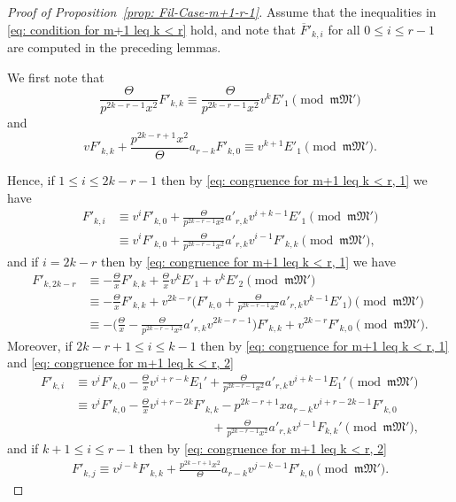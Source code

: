 \documentclass[11pt]{amsart}
\theoremstyle{definition}
\numberwithin{equation}{subsection}
\theoremstyle{plain}
\theoremstyle{plain}
\theoremstyle{plain}
\theoremstyle{plain}
\theoremstyle{plain}
\theoremstyle{plain}
\theoremstyle{plain}
\theoremstyle{plain}
\theoremstyle{plain}
\theoremstyle{plain}
\theoremstyle{plain}
\theoremstyle{plain}
\theoremstyle{definition}
\theoremstyle{definition}
\theoremstyle{definition}
\theoremstyle{remark}
\renewcommand{\(}{\textup{(}}
\renewcommand{\)}{\textup{)}}
\newcommand{\fM}{\mathfrak{M}}
\newcommand{\fm}{\mathfrak{m}}
\newcommand{\barF}{\overline{F}}
\begin{document}
\begin{proof}[Proof of Proposition~\ref{prop: Fil-Case-m+1-r-1}]
Assume that the inequalities in \eqref{eq: condition for m+1 leq k < r} hold, and note that $\barF'_{k,i}$ for all $0\leq i\leq r-1$ are computed in the preceding lemmas.

We first note that
\begin{equation}\label{eq: congruence for m+1 leq k < r, 1}
    \frac{\Theta}{p^{2k-r-1}x^2}F'_{k,k}
    \equiv
    \frac{\Theta}{p^{2k-r-1}x^2}v^kE'_1
    \pmod{\fm\fM'}
\end{equation}
and
\begin{equation}\label{eq: congruence for m+1 leq k < r, 2}
    vF'_{k,k}+\frac{p^{2k-r+1}x^2}{\Theta}a_{r-k}F'_{k,0}
    \equiv v^{k+1}E'_1  \pmod{\fm\fM'}.
\end{equation}


Hence, if $1\leq i\leq 2k-r-1$ then by \eqref{eq: congruence for m+1 leq k < r, 1} we have
\begin{align*}
F'_{k,i}
    &\equiv
    v^iF'_{k,0}+\frac{\Theta}{p^{2k-r-1}x^2}a'_{r,k}v^{i+k-1}E'_1\pmod{\fm\fM'}\\
    &\equiv
    v^iF'_{k,0}+\frac{\Theta}{p^{2k-r-1}x^2}a'_{r,k}v^{i-1}F'_{k,k}
    \pmod{\fm\fM'},
\end{align*}
and if $i=2k-r$ then by \eqref{eq: congruence for m+1 leq k < r, 1} we have
\begin{align*}
F'_{k,2k-r}
    &\equiv
    -\frac{\Theta}{x}F'_{k,k}
    +\frac{\Theta}{x}v^kE'_1+v^kE'_2\pmod{\fm\fM'}\\
    &\equiv
    -\frac{\Theta}{x}F'_{k,k}
    +v^{2k-r}\bigg(F'_{k,0}+\frac{\Theta}{p^{2k-r-1}x^2}a'_{r,k}v^{k-1}E'_1\bigg)\pmod{\fm\fM'}\\
    &\equiv
    -\bigg(\frac{\Theta}{x}-\frac{\Theta}{p^{2k-r-1}x^2}a'_{r,k}v^{2k-r-1}\bigg)F'_{k,k}
    +v^{2k-r}F'_{k,0}
    \pmod{\fm\fM'}.
\end{align*}
Moreover, if $2k-r+1\leq i\leq k-1$ then by \eqref{eq: congruence for m+1 leq k < r, 1} and \eqref{eq: congruence for m+1 leq k < r, 2}
\begin{align*}
F'_{k,i}&\equiv v^iF'_{k,0}-\frac{\Theta}{x}v^{i+r-k}E_1'+\frac{\Theta}{p^{2k-r-1}x^2}a'_{r,k}v^{i+k-1}E_1'\pmod{\fm\fM'}\\
&\equiv v^iF'_{k,0}-\frac{\Theta}{x}v^{i+r-2k}F'_{k,k} -p^{2k-r+1}xa_{r-k}v^{i+r-2k-1}F'_{k,0} \\
&\hspace{11em} +\frac{\Theta}{p^{2k-r-1}x^2}a'_{r,k}v^{i-1}F_{k,k}'\pmod{\fm\fM'},
\end{align*}
and if $k+1\leq i\leq r-1$ then by \eqref{eq: congruence for m+1 leq k < r, 2}
\begin{align*}
F'_{k,j}\equiv v^{j-k}F'_{k,k}+\frac{p^{2k-r+1}x^2}{\Theta}a_{r-k}v^{j-k-1}F'_{k,0}\pmod{\fm\fM'}.
\end{align*}


\end{proof}
\end{document}
